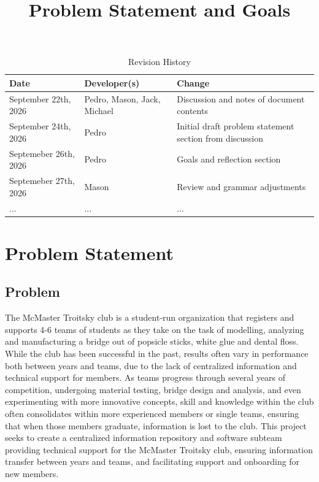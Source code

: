 \documentclass{article}
\title{Problem Statement and Goals\\\progname}
\author{\authname}
\date{}
\begin{document}
\maketitle

\begin{table}[hp]
\caption{Revision History} \label{TblRevisionHistory}
\begin{tabularx}{\textwidth}{llX}
\toprule
\textbf{Date} & \textbf{Developer(s)} & \textbf{Change}\\
\midrule
September 22th, 2026 & Pedro, Mason, Jack, Michael & Discussion and notes of document contents\\
September 24th, 2026 & Pedro & Initial draft problem statement section from discussion\\
Septemeber 26th, 2026 & Pedro & Goals and reflection section\\
Septemeber 27th, 2026 & Mason & Review and grammar adjustments\\
... & ... & ...\\
\bottomrule
\end{tabularx}
\end{table}

\section{Problem Statement}

\subsection{Problem}

The McMaster Troitsky club is a student-run organization that registers and 
supports 4-6 teams of students as they take on the task of modelling, analyzing 
and manufacturing a bridge out of popsicle sticks, white glue and dental floss. 
While the club has been successful in the past, results often vary in performance 
both between years and teams, due to the lack of centralized information and technical 
support for members. As teams progress through several years of competition, 
undergoing material testing, bridge design and analysis, and even experimenting with 
more innovative concepts, skill and knowledge within the club often consolidates within 
more experienced members or single teams, ensuring that when those members graduate, information 
is lost to the club. This project seeks to create a centralized information repository and
software subteam providing technical support for the McMaster Troitsky club, ensuring information transfer between years and teams, 
and facilitating support and onboarding for new members.
\end{document}
